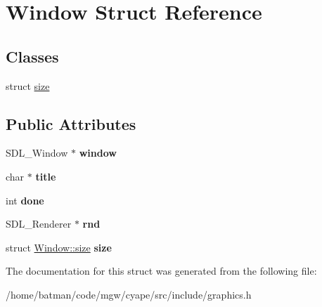 \hypertarget{structWindow}{}\section{Window Struct Reference}
\label{structWindow}
\subsection*{Classes}
\begin{DoxyCompactItemize}
\item 
struct \hyperlink{structWindow_1_1size}{size}
\end{DoxyCompactItemize}
\subsection*{Public Attributes}
\begin{DoxyCompactItemize}
\item 
\hypertarget{structWindow_ae39a7755a5a6ab74bcbdbe3e2e206820}{}S\+D\+L\+\_\+\+Window $\ast$ {\bfseries window}\label{structWindow_ae39a7755a5a6ab74bcbdbe3e2e206820}

\item 
\hypertarget{structWindow_a2712e1af7ae5101a41ba0a2eadbd1ce8}{}char $\ast$ {\bfseries title}\label{structWindow_a2712e1af7ae5101a41ba0a2eadbd1ce8}

\item 
\hypertarget{structWindow_a2fb7cd7649bb6dd6ec0be2db4e4ff56d}{}int {\bfseries done}\label{structWindow_a2fb7cd7649bb6dd6ec0be2db4e4ff56d}

\item 
\hypertarget{structWindow_a061f0f06f775913c0d26ff6ffb84640f}{}S\+D\+L\+\_\+\+Renderer $\ast$ {\bfseries rnd}\label{structWindow_a061f0f06f775913c0d26ff6ffb84640f}

\item 
\hypertarget{structWindow_ad49e12e274d290a4fc484ebb6d8808c6}{}struct \hyperlink{structWindow_1_1size}{Window\+::size} {\bfseries size}\label{structWindow_ad49e12e274d290a4fc484ebb6d8808c6}

\end{DoxyCompactItemize}


The documentation for this struct was generated from the following file\+:\begin{DoxyCompactItemize}
\item 
/home/batman/code/mgw/cyape/src/include/graphics.\+h\end{DoxyCompactItemize}

